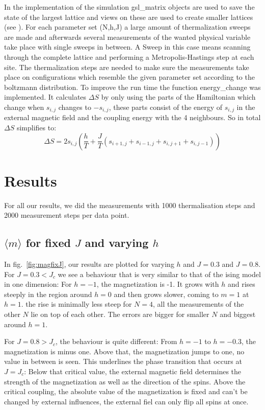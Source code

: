 \documentclass{scrartcl}
\begin{document}
In the implementation of the simulation gsl\_matrix objects are used to save the state of the largest lattice and views on these are used to create smaller lattices (see \cite{gsldoc_mat}). For each parameter set (N,h,J) a large amount of thermalization sweeps are made and afterwards several measurements of the wanted physical variable take place with single sweeps in between. A Sweep in this case means scanning through the complete lattice and performing a Metropolis-Hastings step at each site. The thermalization steps are needed to make sure the measurements take place on configurations which resemble the given parameter set according to the boltzmann distribution. To improve the run time the function energy\_change was implemented. It calculates $\Delta S$ by only using the parts of the Hamiltonian which change when $s_{i,j}$ changes to $-s_{i,j}$, these parts consist of the energy of $s_{i,j}$ in the external magnetic field and the coupling energy with the 4 neighbours.
So in total $\Delta S$ simplifies to:
\begin{equation}
	\Delta S=2 s_{i,j}\left(\dfrac{h}{T}+\dfrac{J}{T}(s_{i+1,j}+s_{i-1,j}+s_{i,j+1}+s_{i,j-1})\right)
\end{equation}


\section{Results}

For all our results, we did the measurements with 1000 thermalisation steps and 2000 measurement steps per data point.

\subsection{$\langle m\rangle$ for fixed $J$ and varying $h$}
In fig.~\ref{fig:magfixJ}, our results are plotted for varying $h$ and $J=0.3$ and $J=0.8$. For $J=0.3<J_c$ we see a behaviour that is very similar to that of the ising model in one dimension: For $h=-1$, the magnetization is -1. It grows with $h$ and rises steeply in the region around $h=0$ and then grows slower, coming to $m=1$ at $h=1$. the rise is minimally less steep for $N=4$, all the measurements of the other $N$ lie on top of each other. The errors are bigger for smaller $N$ and biggest around $h=1$.
 
For $J=0.8>J_c$, the behaviour is quite different: From $h=-1$ to $h=-0.3$, the magnetization is minus one. Above that, the magnetization jumps to one, no value in between is seen. This underlines the phase transition that occurs at $J=J_c$: Below that critical value, the external magnetic field determines the strength of the magnetization as well as the direction of the spins. Above the critical coupling, the absolute value of the magnetization is fixed and can't be changed by external influences, the external fiel can only flip all spins at once.
\end{document}
